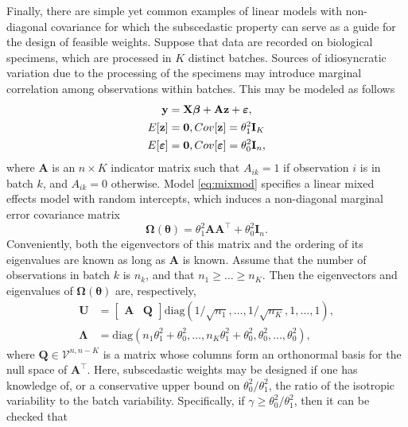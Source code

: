 \documentclass[12pt]{article}
\newcommand{\Exp}[1]{{\rm{E}}[ #1 ]}
\newcommand{\Cov}[1]{{\rm{Cov}}[ #1 ]}
\newcommand{\bl}[1]{{\mathbf #1}}
\newcommand{\bs}[1]{\boldsymbol #1}
\begin{document}
{Finally, there are simple yet common examples of linear models with non-diagonal covariance for which the subscedastic property can serve as a guide for the design of feasible weights. Suppose that data are recorded on biological specimens, which are processed in $K$ distinct batches. Sources of idiosyncratic variation due to the processing of the specimens may introduce marginal correlation among observations within batches. This may be modeled as follows
\begin{equation}\label{eq:mixmod}
\begin{aligned}
    \bl{y} &= \bl{X}\bs{\beta} + \bl{A}\bl{z} + \bs{\varepsilon}, \\
    \Exp{\bl{z}} &=  \bl{0}, \Cov{\bl{z}} = \theta_1^2 \bl{I}_K \\
    \Exp{\bs{\varepsilon}} &=  \bl{0}, \Cov{\bs{\varepsilon}} = \theta_0^2 \bl{I}_n,
\end{aligned}
\end{equation}
where $\bl{A}$ is an $n \times K$ indicator matrix such that $A_{ik} = 1$ if observation $i$ is in batch $k$, and $A_{ik} = 0$ otherwise. Model \eqref{eq:mixmod} specifies a linear mixed effects model with random intercepts, which induces a non-diagonal marginal error covariance matrix
\begin{equation*}
    \bs{\Omega}(\bs{\theta}) = \theta_1^2 \bl{A}\bl{A}^\top + \theta_0^2 \bl{I}_n.
\end{equation*}
Conveniently, both the eigenvectors of this matrix and the ordering of its eigenvalues are known as long as $\bl{A}$ is known. Assume that the number of observations in batch $k$ is $n_k$, and that $n_1 \geq \dots \geq n_K$. Then the eigenvectors and eigenvalues of $\bs{\Omega}(\bs{\theta})$ are, respectively,
\begin{equation*}
\begin{aligned}
    \bl{U} &= \begin{bmatrix}\bl{A} &\bl{Q}\end{bmatrix}\mathrm{diag}(1/\sqrt{n_1}, \dots, 1/\sqrt{n_K}, 1, \dots, 1), \\
    \bs{\Lambda} &= \mathrm{diag}(n_1 \theta_1^2 + \theta_0^2, \dots, n_K \theta_1^2 + \theta_0^2, \theta_0^2, \dots, \theta_0^2),
\end{aligned}
\end{equation*}
where $\bl{Q} \in \mathcal{V}^{n, n-K}$ is a matrix whose columns form an orthonormal basis for the null space of $\bl{A}^\top$. Here, subscedastic weights may be designed if one has knowledge of, or a conservative upper bound on $\theta_0^2/\theta_1^2$, the ratio of the isotropic variability to the batch variability. Specifically, if $\gamma \geq \theta_0^2/\theta_1^2$, then it can be checked that
}
\end{document}
